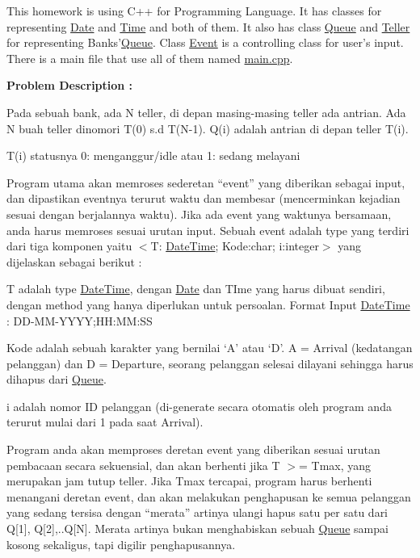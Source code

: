 This homework is using C++ for Programming Language. It has classes for representing \hyperlink{class_date}{Date} and \hyperlink{class_time}{Time} and both of them. It also has class \hyperlink{class_queue}{Queue} and \hyperlink{class_teller}{Teller} for representing Banks'\hyperlink{class_queue}{Queue}. Class \hyperlink{class_event}{Event} is a controlling class for user's input. There is a main file that use all of them named \hyperlink{main_8cpp}{main.\-cpp}.

{\bfseries Problem Description \-:}\par
 Pada sebuah bank, ada N teller, di depan masing-\/masing teller ada antrian. Ada N buah teller dinomori T(0) s.\-d T(N-\/1). Q(i) adalah antrian di depan teller T(i).\par


T(i) statusnya 0\-: menganggur/idle atau 1\-: sedang melayani\par


Program utama akan memroses sederetan “event” yang diberikan sebagai input, dan dipastikan eventnya terurut waktu dan membesar (mencerminkan kejadian sesuai dengan berjalannya waktu). Jika ada event yang waktunya bersamaan, anda harus memroses sesuai urutan input. Sebuah event adalah type yang terdiri dari tiga komponen yaitu $<$T\-: \hyperlink{class_date_time}{Date\-Time}; Kode\-:char; i\-:integer$>$ yang dijelaskan sebagai berikut \-: \par
 
\begin{DoxyEnumerate}
\item T adalah type \hyperlink{class_date_time}{Date\-Time}, dengan \hyperlink{class_date}{Date} dan T\-Ime yang harus dibuat sendiri, dengan method yang hanya diperlukan untuk persoalan. Format Input \hyperlink{class_date_time}{Date\-Time} \-: D\-D-\/\-M\-M-\/\-Y\-Y\-Y\-Y;H\-H\-:\-M\-M\-:S\-S 
\item Kode adalah sebuah karakter yang bernilai ‘\-A’ atau ‘\-D’. A = Arrival (kedatangan pelanggan) dan D = Departure, seorang pelanggan selesai dilayani sehingga harus dihapus dari \hyperlink{class_queue}{Queue}. 
\item i adalah nomor I\-D pelanggan (di-\/generate secara otomatis oleh program anda terurut mulai dari 1 pada saat Arrival). 
\end{DoxyEnumerate}

Program anda akan memproses deretan event yang diberikan sesuai urutan pembacaan secara sekuensial, dan akan berhenti jika T $>$= Tmax, yang merupakan jam tutup teller. Jika Tmax tercapai, program harus berhenti menangani deretan event, dan akan melakukan penghapusan ke semua pelanggan yang sedang tersisa dengan “merata” artinya ulangi hapus satu per satu dari Q\mbox{[}1\mbox{]}, Q\mbox{[}2\mbox{]},..Q\mbox{[}N\mbox{]}. Merata artinya bukan menghabiskan sebuah \hyperlink{class_queue}{Queue} sampai kosong sekaligus, tapi digilir penghapusannya.

